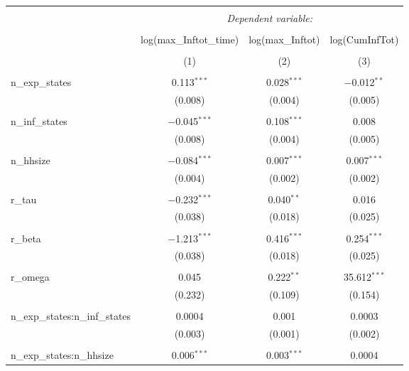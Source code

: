 
\begin{table}[!htbp] \centering 
  \caption{} 
  \label{} 
\begin{tabular}{@{\extracolsep{5pt}}lccc} 
\\[-1.8ex]\hline 
\hline \\[-1.8ex] 
 & \multicolumn{3}{c}{\textit{Dependent variable:}} \\ 
\cline{2-4} 
\\[-1.8ex] & log(max\_Inftot\_time) & log(max\_Inftot) & log(CumInfTot) \\ 
\\[-1.8ex] & (1) & (2) & (3)\\ 
\hline \\[-1.8ex] 
 n\_exp\_states & 0.113$^{***}$ & 0.028$^{***}$ & $-$0.012$^{**}$ \\ 
  & (0.008) & (0.004) & (0.005) \\ 
  & & & \\ 
 n\_inf\_states & $-$0.045$^{***}$ & 0.108$^{***}$ & 0.008 \\ 
  & (0.008) & (0.004) & (0.005) \\ 
  & & & \\ 
 n\_hhsize & $-$0.084$^{***}$ & 0.007$^{***}$ & 0.007$^{***}$ \\ 
  & (0.004) & (0.002) & (0.002) \\ 
  & & & \\ 
 r\_tau & $-$0.232$^{***}$ & 0.040$^{**}$ & 0.016 \\ 
  & (0.038) & (0.018) & (0.025) \\ 
  & & & \\ 
 r\_beta & $-$1.213$^{***}$ & 0.416$^{***}$ & 0.254$^{***}$ \\ 
  & (0.038) & (0.018) & (0.025) \\ 
  & & & \\ 
 r\_omega & 0.045 & 0.222$^{**}$ & 35.612$^{***}$ \\ 
  & (0.232) & (0.109) & (0.154) \\ 
  & & & \\ 
 n\_exp\_states:n\_inf\_states & 0.0004 & 0.001 & 0.0003 \\ 
  & (0.003) & (0.001) & (0.002) \\ 
  & & & \\ 
 n\_exp\_states:n\_hhsize & 0.006$^{***}$ & 0.003$^{***}$ & 0.0004 \\ 

\end{tabular}
\end{table}

